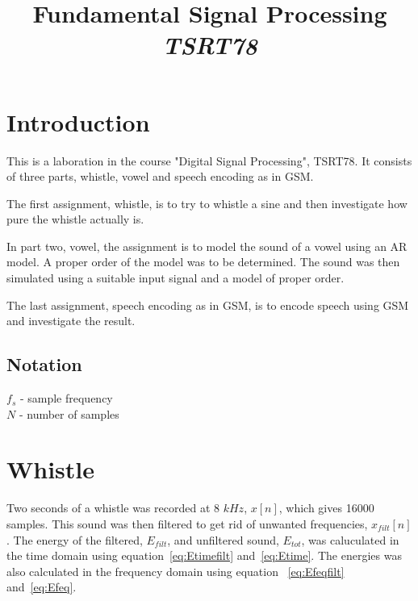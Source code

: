 \documentclass[10pt]{article}
\title{Fundamental Signal Processing\\
\emph{TSRT78}}
\begin{document}


\maketitle

\newpage
\tableofcontents
\newpage

\section{Introduction}
This is a laboration in the course "Digital Signal Processing", TSRT78.
It consists of three parts, whistle, vowel and speech encoding as in GSM.

The first assignment, whistle, is to try to whistle a sine and then
investigate how pure the whistle actually is.

In part two, vowel, the assignment is to model the sound of a vowel
using an AR model. A proper order of the model was to be determined.
The sound was then simulated using a suitable input signal and a
model of proper order.

The last assignment, speech encoding as in GSM, is to encode speech
using GSM and investigate the result.

\subsection{Notation}
$f_s$ - sample frequency\\
$N$ - number of samples

\section{Whistle}
Two seconds of a whistle was recorded at 8 $kHz$, $x[n]$, which gives 16000 samples.
This sound was then filtered to get rid of unwanted frequencies, $x_{filt}[n]$.
The energy of the filtered, $E_{filt}$, and unfiltered sound, $E_{tot}$,
was caluculated in the time domain using equation~\ref{eq:Etimefilt}
and~\ref{eq:Etime}. The energies was also calculated in the frequency
domain using equation ~\ref{eq:Efeqfilt} and~\ref{eq:Efeq}.
\end{document}
